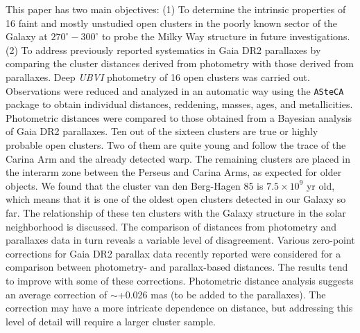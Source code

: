 \documentclass[draft]{aa}
\begin{document}
\abstract
{}
{This paper has two main objectives:
(1) To determine the intrinsic properties of 16 faint and mostly
unstudied open clusters in the poorly known sector
of the Galaxy at $270^\circ-300^\circ$ to probe the Milky Way
structure in future investigations.
(2) To address previously reported systematics in Gaia DR2 parallaxes by
comparing the cluster distances derived from photometry with
those derived from parallaxes.
}
%
{Deep \textit{UBVI} photometry of 16 open clusters was carried out.
Observations were reduced and analyzed in an automatic way using the 
\texttt{ASteCA} package to obtain individual distances, reddening,
masses, ages, and metallicities. Photometric distances were compared to
those obtained from a Bayesian analysis of Gaia DR2 parallaxes.
}
%
{Ten out of the sixteen clusters are true or highly probable open
clusters. Two of them are quite young and follow the trace of the Carina Arm
and the already detected warp.
The remaining clusters are placed in the interarm zone between the
Perseus and Carina Arms, as expected for older objects.
We found that the cluster van den Berg-Hagen 85 is $7.5\times10^9$ yr
old, which means that it is one of the oldest open clusters detected in our
Galaxy so far.
%
The relationship of these ten clusters with the Galaxy structure in
the solar neighborhood is discussed.
The comparison of distances from photometry and parallaxes data in turn
reveals a variable level of disagreement.
}
%
{
Various zero-point corrections for Gaia DR2 parallax data recently
reported were considered for a comparison between photometry- and
parallax-based distances.
The results tend to improve with some of these corrections. 
Photometric distance analysis suggests an average correction of
$\sim$+0.026 mas (to be added to the parallaxes).
%
The correction may have a more intricate dependence on distance, but addressing
this level of detail will require a larger cluster sample.
}


\maketitle
\end{document}
